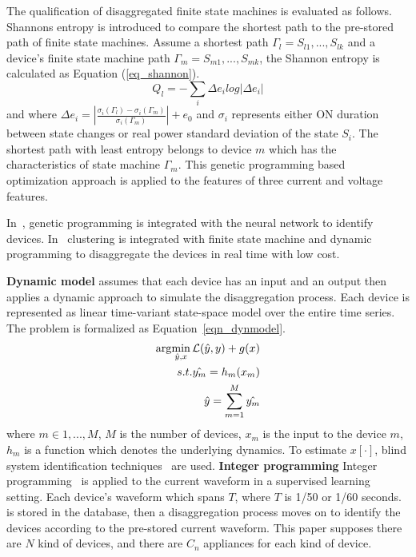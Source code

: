 The qualification of disaggregated finite state machines
is evaluated as follows. 
Shannons entropy is introduced to compare 
the shortest path 
to the pre-stored path of finite state machines.
Assume a shortest path $\Gamma_l={S_{l1},...,S_{lk}}$
and a device's finite state machine path $\Gamma_m={S_{m1},...,S_{mk}}$, 
the Shannon entropy is calculated as Equation (\ref{eq_shannon}).
\begin{equation}
Q_l=  - \sum_i \Delta e_i log|\Delta e_i|
\label{eq_shannon}
\end{equation}
and
where 
$\Delta e_i = |\frac{\sigma_i(\Gamma_l)-\sigma_i(\Gamma_m) }{\sigma_i(\Gamma_m)}|+e_0 $
and $\sigma_i$ represents either ON duration between state changes or real power standard deviation of
the state $S_i$.
The shortest path with least entropy belongs to device $m$ which has the characteristics of 
state machine $\Gamma_m$.
This genetic programming based optimization approach 
is applied to the features of three current and voltage features. 

In~\cite{chang2010newmethod},
genetic programming is integrated with the neural network
to identify devices. In~\cite{vogiatzis2013real} clustering is integrated with finite state machine 
and dynamic programming to disaggregate the devices in real time with low cost.

\textbf{Dynamic model}
\cite{dong2013dynamical} assumes that each device has an input and an output then 
applies a dynamic approach to simulate the disaggregation process. 
Each device is represented as linear time-variant state-space model over the 
entire time series. 
The problem is formalized as Equation~\eqref{eqn_dynmodel}.
\begin{equation}
\label{eqn_dynmodel}
\begin{aligned}
\arg\!\min_{\hat{y},x} \mathcal{L}(\hat{y},y) + g(x) \\
s.t. \hat{y_m} = h_m(x_m)\\
\hat{y}=\sum_{m=1}^{M} \hat{y_m}
\end{aligned}
\end{equation}
where $m\in{1,...,M}$, $M$ is the number of devices, $x_m$ is the input to the device $m$, 
$h_m$ is a function which denotes the underlying dynamics. 
To estimate $x[\cdot]$, blind system identification techniques~\cite{abed1997blind} are used. 
\textbf{Integer programming}
Integer programming~\cite{suzuki2008nonintrusive} is applied
to the current waveform in a supervised learning setting.
Each device's waveform which spans $T$, where $T$ is 1/50 or 1/60 seconds.  
is stored in the database,
then a disaggregation process moves on to identify the
devices according to the pre-stored current waveform.
This paper supposes there are $N$ kind of devices, 
and there are $C_n$ appliances for each kind of device. 

